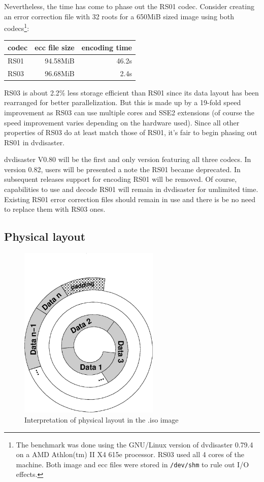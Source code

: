\smallskip

Nevertheless, the time has come to phase out the RS01 codec.
Consider creating an error correction file with 32 roots 
for a 650MiB sized image using both  codecs\footnote{The benchmark was
done using the GNU/Linux version 
of dvdisaster 0.79.4 on a AMD Athlon(tm) II X4 615e 
processor. RS03 used all 4 cores of the machine.
Both image and ecc files were stored in {\tt /dev/shm}
to rule out I/O effects.}:

\begin{center}
\begin{tabular}{|l|r|r|}
\hline
codec & ecc file size & encoding time \\
\hline
RS01 & 94.58MiB & 46.2s \\
RS03 & 96.68MiB &  2.4s \\
\hline
\end{tabular}
\end{center}

RS03 is about 2.2\% less storage efficient than RS01 since
its data layout has been rearranged for better parallelization.
But this is made up by a 19-fold speed improvement as
RS03 can use multiple cores and SSE2 extensions
(of course the speed improvement varies depending on the
hardware used).
Since all other properties of RS03 do at least match those
of RS01, it's fair to begin phasing out RS01 in dvdisaster.


dvdisaster V0.80 will be the first and only version 
featuring all three codecs. In version 0.82, users
will be presented a note the RS01 became deprecated.
In subsequent releases support for encoding RS01 will
be removed. Of course, capabilities to use and decode
RS01 will remain in dvdisaster for umlimited time.
Existing RS01 error correction files should remain in use
and there is be no need to replace them with RS03 ones.

\subsection{Physical layout}

\begin{figure}
 \begin{center}
 \includegraphics[width=67mm]{spiral-rs01.eps}
 \caption{Interpretation of physical layout in the .iso image}
 \label{layout-phy-one}
 \end{center}
\end{figure}

